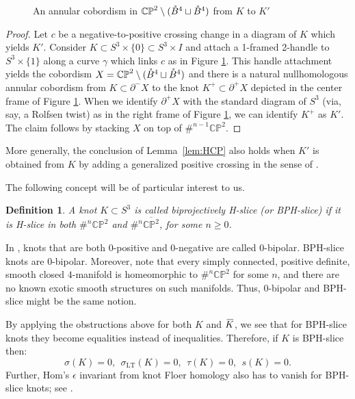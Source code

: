 \documentclass [11pt]{amsart}
\newtheorem {definition}[theorem]{Definition}
\theoremstyle{remark}
\def\CP{\mathbb{CP}^2}
\def\bCP{\overline{\mathbb{CP}^2}}
\newcommand{\mK} {\mkern3mu \overline{\mkern-3mu K \mkern-1mu} \mkern1mu}
\def\sigmaTL{\sigma_{\operatorname{LT}}}
\newcommand\intB{\smash{\mathring{B}^4}}
\begin{document}
\begin{figure}

{
   \fontsize{9pt}{11pt}\selectfont
   \def\svgwidth{3in}
   
}
\caption{An annular cobordism in $\CP \setminus (\intB \sqcup \intB)$ from $K$ to $K'$}
\label{fig:crossingchange}
\end{figure}

\begin{proof}
Let $c$ be a negative-to-positive crossing change in a diagram of $K$ which yields $K'$.  Consider $K\subset S^3\times \{0\}\subset S^3\times I$ and attach a 1-framed 2-handle to $S^3\times \{1\}$ along a curve $\gamma$ which links $c$ as in Figure \ref{fig:crossingchange}. This handle attachment yields the cobordism $X=\CP \setminus (\intB \sqcup \intB)$ and there is a natural nullhomologous annular cobordism from $K\subset \partial^-X$ to the knot $K^+\subset \partial^+X$ depicted in the center frame of Figure \ref{fig:crossingchange}. When we identify $\partial^+X$ with the standard diagram of $S^3$ (via, say, a Rolfsen twist) as in the right frame of Figure \ref{fig:crossingchange}, we can identify $K^+$ as $K'$. The claim follows by stacking $X$ on top of $\#^{n-1} \CP$.
\end{proof}

More generally, the conclusion of Lemma~\ref{lem:HCP} also holds when $K'$ is obtained from $K$ by adding a generalized positive crossing in the sense of  \cite[Definition 2.7]{CochranTweedy}.

The following concept will be of particular interest to us.
\begin{definition}
A knot $K \subset S^3$ is called {\em biprojectively H-slice} (or {\em BPH-slice}) if it is H-slice in both $\#^n \CP$ and $\#^n \bCP$, for some $n \geq 0$.
\end{definition}
In \cite{CochranHarveyHorn}, knots that are both $0$-positive and $0$-negative are called $0$-bipolar. BPH-slice knots are $0$-bipolar. Moreover, note that every simply connected, positive definite, smooth closed $4$-manifold is homeomorphic to $\#^n \CP$ for some $n$, and there are no known exotic smooth structures on such manifolds. Thus, $0$-bipolar and BPH-slice might be the same notion.

By applying the obstructions above for both $K$ and $\mK$, we see that for BPH-slice knots they become equalities instead of inequalities. Therefore, if $K$ is BPH-slice then:
$$\sigma(K)=0, \ \ \sigmaTL(K)=0, \ \ \tau(K) = 0, \ \ s(K)=0.$$
Further, Hom's $\epsilon$ invariant from knot Floer homology \cite{Hom} also has to vanish for BPH-slice knots; see \cite[Proposition 4.10]{CochranHarveyHorn}.
\end{document}
